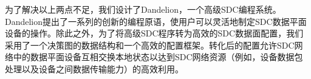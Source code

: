 \documentclass{ctexart}
\begin{document}

为了解决以上两点不足，我们设计了Dandelion，一个高级SDC编程系统。Dandelion提出了一系列的创新的编程原语，使用户可以灵活地制定SDC数据平面设备的操作。除此之外，为了将高级SDC程序转为高效的SDC数据面配置，我们采用了一个决策图的数据结构和一个高效的配置框架。转化后的配置允许SDC网络中的数据平面设备互相交换本地状态以达到SDC网络资源（例如，设备数据包处理以及设备之间数据传输能力）的高效利用。

%
 
\end{document}
